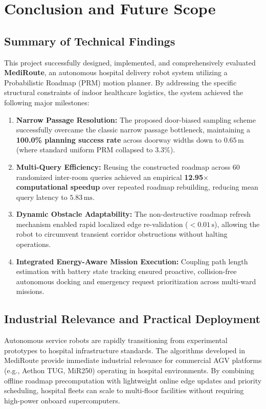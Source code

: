 \documentclass[12pt,a4paper]{article}
\begin{document}
\newpage

\section{Conclusion and Future Scope}

\subsection{Summary of Technical Findings}
This project successfully designed, implemented, and comprehensively evaluated \textbf{MediRoute}, an autonomous hospital delivery robot system utilizing a Probabilistic Roadmap (PRM) motion planner. By addressing the specific structural constraints of indoor healthcare logistics, the system achieved the following major milestones:
\begin{enumerate}[itemsep=2pt,topsep=2pt]
\item \textbf{Narrow Passage Resolution:} The proposed door-biased sampling scheme successfully overcame the classic narrow passage bottleneck, maintaining a \textbf{100.0\% planning success rate} across doorway widths down to $0.65\,\text{m}$ (where standard uniform PRM collapsed to $3.3\%$).
\item \textbf{Multi-Query Efficiency:} Reusing the constructed roadmap across 60 randomized inter-room queries achieved an empirical \textbf{12.95$\times$ computational speedup} over repeated roadmap rebuilding, reducing mean query latency to $5.83\,\text{ms}$.
\item \textbf{Dynamic Obstacle Adaptability:} The non-destructive roadmap refresh mechanism enabled rapid localized edge re-validation ($<0.01\,\text{s}$), allowing the robot to circumvent transient corridor obstructions without halting operations.
\item \textbf{Integrated Energy-Aware Mission Execution:} Coupling path length estimation with battery state tracking ensured proactive, collision-free autonomous docking and emergency request prioritization across multi-ward missions.
\end{enumerate}

\subsection{Industrial Relevance and Practical Deployment}
Autonomous service robots are rapidly transitioning from experimental prototypes to hospital infrastructure standards. The algorithms developed in MediRoute provide immediate industrial relevance for commercial AGV platforms (e.g., Aethon TUG, MiR250) operating in hospital environments. By combining offline roadmap precomputation with lightweight online edge updates and priority scheduling, hospital fleets can scale to multi-floor facilities without requiring high-power onboard supercomputers.
\end{document}
